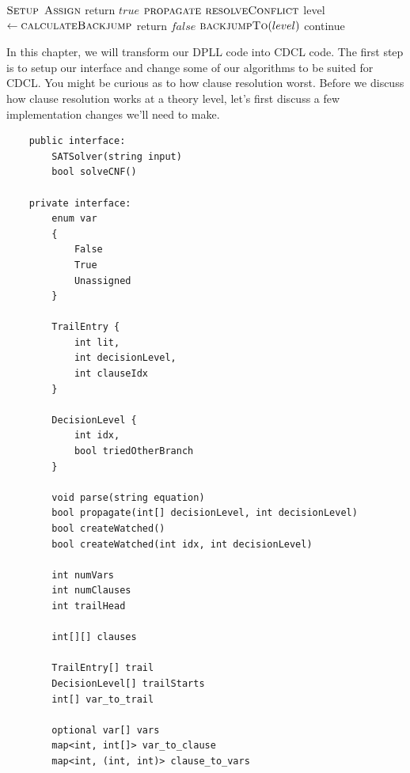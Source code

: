 \begin{algorithm}[H]
\caption{High Level CDCL}\label{alg:27}
\begin{algorithmic}[1]

\State $\Call{Setup}{}$
    \State $\Call{Assign}{}$
        \State return $true$
    \EndIf
    \State $\Call{propagate}{}$
        \State $\Call{resolveConflict}{}$
        \State level $\gets \Call{calculateBackjump}{}$
            \State return $false$
        \EndIf
        \State $\Call{backjumpTo}{level}$
        \State continue
    \EndIf
\EndWhile

\EndProcedure
\end{algorithmic}
\end{algorithm}

In this chapter, we will transform our DPLL code into CDCL code. The first step is 
to setup our interface and change some of our algorithms to be suited for CDCL. You 
might be curious as to how clause resolution worst. Before we discuss how clause resolution 
works at a theory level, let's first discuss a few implementation changes we'll need to make.

\begin{lstlisting}
    public interface:
        SATSolver(string input)
        bool solveCNF()

    private interface:
        enum var
        {
            False
            True
            Unassigned
        }

        TrailEntry {
            int lit,
            int decisionLevel,
            int clauseIdx
        }

        DecisionLevel {
            int idx,
            bool triedOtherBranch
        }

        void parse(string equation)
        bool propagate(int[] decisionLevel, int decisionLevel)
        bool createWatched()
        bool createWatched(int idx, int decisionLevel)

        int numVars
        int numClauses
        int trailHead

        int[][] clauses
        
        TrailEntry[] trail
        DecisionLevel[] trailStarts
        int[] var_to_trail

        optional var[] vars
        map<int, int[]> var_to_clause
        map<int, (int, int)> clause_to_vars
\end{lstlisting}


